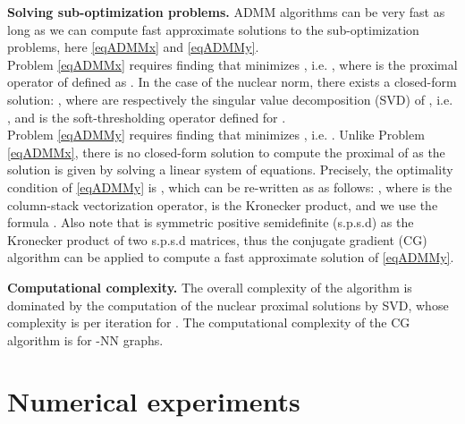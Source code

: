 \documentclass{article}
\begin{document}
{\bf Solving sub-optimization problems.} ADMM algorithms can be very fast as long as we can compute fast approximate solutions to the sub-optimization problems, here \eqref{eqADMMx} and \eqref{eqADMMy}. \\
Problem \eqref{eqADMMx} requires finding  that minimizes , i.e. , where  is the proximal operator of  defined as . In the case of the nuclear norm, there exists a closed-form solution: , where  are respectively the singular value decomposition (SVD) of , i.e. , and  is the soft-thresholding operator defined for  \cite{cai2010singular}.\\
Problem \eqref{eqADMMy} requires finding  that minimizes , i.e. . Unlike Problem \eqref{eqADMMx}, there is no closed-form solution to compute the proximal of  as the solution is given by solving a linear system of equations. Precisely, the optimality condition of \eqref{eqADMMy} is , which can be re-written as  as follows: , where  is the column-stack vectorization operator,  is the Kronecker product,  and we use the formula . Also note that  is symmetric positive semidefinite (s.p.s.d) as the Kronecker product of two s.p.s.d matrices, thus the conjugate gradient (CG) algorithm can be applied to compute a fast approximate solution of \eqref{eqADMMy}.






{\bf Computational complexity.} The overall complexity of the algorithm is dominated by the computation of the nuclear proximal solutions by SVD, whose complexity is 
per iteration for  \cite{golub2012matrix}. The computational complexity of the CG algorithm is 
for -NN graphs.








































\vspace{-0.05cm}
\section{Numerical experiments}
\vspace{-0.15cm}
\end{document}
